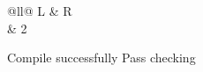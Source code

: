 \documentclass[11pt,oneside,openany,full]{on1x-book}
\begin{document}
\begin{OnxLongTable}{@{}ll@{}}
L & R\\  & 2\\
\end{OnxLongTable}
\begin{OnxOptions}
\end{OnxOptions}
\begin{OnxChecklist}
\item Compile successfully
\OnxDone Pass checking
\end{OnxChecklist}
\begin{OnxQuiz}
\end{OnxQuiz}
\end{document}
